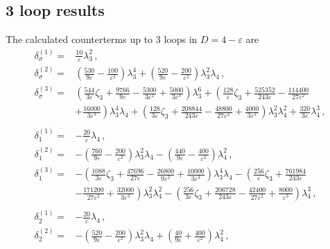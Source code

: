 \documentclass[a4paper,11pt]{article}
\begin{document}
\subsection{3 loop results}

The calculated counterterms up to 3 loops in $D = 4 - \varepsilon$ are 
\begin{align}
    \delta_\sigma^{(1)} =& \frac{10}{\varepsilon}\lambda_3^2 \,,\\
    \delta_\sigma^{(2)} =& \left(\frac{530}{9\varepsilon}   - \frac{100}{\varepsilon^2}\right)\lambda_3^4 + \left(\frac{520}{9 \varepsilon } - \frac{200}{\varepsilon^2} \right)\lambda_3^2\lambda_4 \,, \label{eq:deltaPhiL2} \\
    \delta_\sigma^{(3)} =& \left(\frac{544}{3\varepsilon}  \zeta_3 + \frac{9766}{9\varepsilon}- \frac{5300}{3\varepsilon^2}  + \frac{5000}{3\varepsilon^3} \right)\lambda_3^6  + \left(\frac{128}{\varepsilon}  \zeta_3 + \frac{525352}{243\varepsilon}- \frac{114400}{27\varepsilon^2} \right. \nonumber\\
    & \left. + \frac{16000}{3\varepsilon^3} \right)\lambda_3^4\lambda_4  + \left(\frac{128}{3\varepsilon}  \zeta_3 + \frac{208844}{243\varepsilon}- \frac{48800}{27\varepsilon^2} + \frac{4000}{3\varepsilon^3} \right)\lambda_3^2\lambda^2_4  + \frac{320}{3\varepsilon}\lambda_4^3 \,,\\    
&\nonumber\\
    \delta_1^{(1)} =& -\frac{20}{\varepsilon}\lambda_4 \,, \\
    \delta_1^{(2)} =& - \left( \frac{760}{9 \varepsilon} - \frac{200}{\varepsilon^2}\right)\lambda_3^2 \lambda_4 - \left(\frac{440}{9\varepsilon} - \frac{400}{\varepsilon^2} \right)\lambda_4^2 \,, \\
    \delta_1^{(3)} =& - \left(\frac{1088}{3\varepsilon}  \zeta_3 + \frac{47696}{27\varepsilon} - \frac{26800}{9\varepsilon^2} + \frac{10000}{3\varepsilon^3} \right)\lambda_3^4\lambda_4    - \left(\frac{256}{\varepsilon}  \zeta_3 + \frac{761984}{243\varepsilon}\right.\nonumber \\
    &\left. - \frac{171200}{27\varepsilon^2}  + \frac{32000}{3\varepsilon^3} \right)\lambda_3^2\lambda^2_4  - \left(\frac{256}{3\varepsilon}  \zeta_3 + \frac{206728}{243\varepsilon}
    - \frac{42400}{27\varepsilon^2}  + \frac{8000}{\varepsilon^3} \right)\lambda_4^3\,, \\
&\nonumber\\
    \delta_2^{(1)} =& -\frac{20}{\varepsilon}\lambda_4 \,,\\
    \delta_2^{(2)} =& - \left(\frac{520}{9\varepsilon} - \frac{200}{\varepsilon^2}\right)\lambda_3^2\lambda_4 + \left(\frac{40}{9\varepsilon} + \frac{400}{\varepsilon^2} \right)\lambda_4^2 \,, \\

\end{align}
\end{document}

